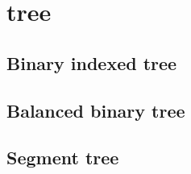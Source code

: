 \newpage
\section{tree}

\subsection{Binary indexed tree}

\subsection{Balanced binary tree}

\subsection{Segment tree}
